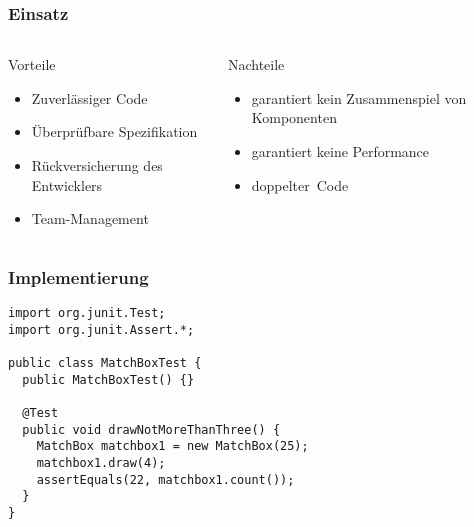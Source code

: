 \begin{frame}
  \frametitle{Einsatz}

  \begin{columns}[T,onlytextwidth]
    \begin{exampleblock}{Vorteile}
      \begin{itemize}
        \item Zuverlässiger Code
        \item Überprüfbare Spezifikation
        \item Rückversicherung des Entwicklers
        \item Team-Management
      \end{itemize}
    \end{exampleblock}

    \begin{alertblock}{Nachteile}
      \begin{itemize}
        \item garantiert kein Zusammenspiel von Komponenten
        \item garantiert keine Performance
        \item \glqq doppelter\grqq\ Code
      \end{itemize}
    \end{alertblock}
  \end{columns}
\end{frame}

\begin{frame}[fragile]
  \frametitle{Implementierung}

  \begin{verbatim}
import org.junit.Test;
import org.junit.Assert.*;

public class MatchBoxTest {
  public MatchBoxTest() {}

  @Test
  public void drawNotMoreThanThree() {
    MatchBox matchbox1 = new MatchBox(25);
    matchbox1.draw(4);
    assertEquals(22, matchbox1.count());
  }
}
  \end{verbatim}
\end{frame}
